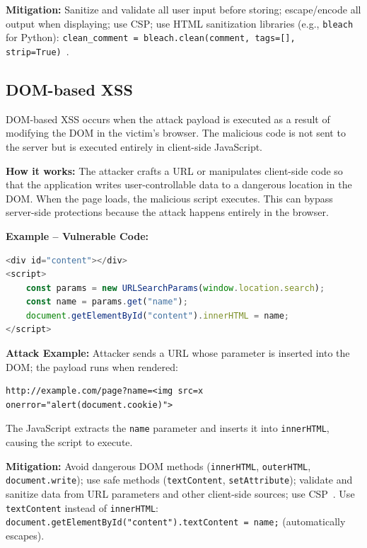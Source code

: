 \textbf{Mitigation:} Sanitize and validate all user input before storing; escape/encode all output when displaying; use CSP; use HTML sanitization libraries (e.g., \texttt{bleach} for Python): \texttt{clean\_comment = bleach.clean(comment, tags=[], strip=True)}~\cite{OWASPXSSCheatsheet,OWASPHTMLSanitizationCheatsheet}.

\subsection{DOM-based XSS}
\label{sec:xss_dom}

DOM-based XSS occurs when the attack payload is executed as a result of modifying the DOM in the victim's browser. The malicious code is not sent to the server but is executed entirely in client-side JavaScript.

\textbf{How it works:} The attacker crafts a URL or manipulates client-side code so that the application writes user-controllable data to a dangerous location in the DOM. When the page loads, the malicious script executes. This can bypass server-side protections because the attack happens entirely in the browser.

\textbf{Example -- Vulnerable Code:}

\begin{lstlisting}[language=JavaScript, basicstyle=\ttfamily\small, keywordstyle=\color{blue}, frame=single, breaklines=true, breakatwhitespace=false]
<div id="content"></div>
<script>
    const params = new URLSearchParams(window.location.search);
    const name = params.get("name");
    document.getElementById("content").innerHTML = name;
</script>
\end{lstlisting}

\textbf{Attack Example:} Attacker sends a URL whose parameter is inserted into the DOM; the payload runs when rendered:
\begin{lstlisting}[style=attackcode]
http://example.com/page?name=<img src=x onerror="alert(document.cookie)">
\end{lstlisting}
The JavaScript extracts the \texttt{name} parameter and inserts it into \texttt{innerHTML}, causing the script to execute.

\textbf{Mitigation:} Avoid dangerous DOM methods (\texttt{innerHTML}, \texttt{outerHTML}, \texttt{document.write}); use safe methods (\texttt{textContent}, \texttt{setAttribute}); validate and sanitize data from URL parameters and other client-side sources; use CSP~\cite{OWASPXSSCheatsheet,OWASPCSPCheatsheet,OWASPInputValidationCheatsheet}. Use \texttt{textContent} instead of \texttt{innerHTML}: \texttt{document.getElementById("content").textContent = name;} (automatically escapes).


